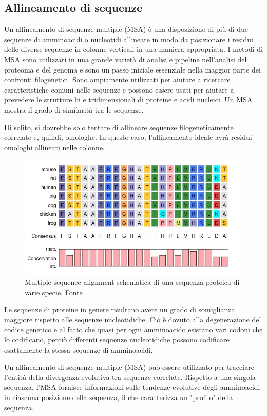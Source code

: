 \subsection{Allineamento di sequenze} \label{sec:MSA}
{
	Un allineamento di sequenze multiple (MSA) è una disposizione di più di due sequenze di amminoacidi o nucleotidi allineate in modo da posizionare i residui delle diverse sequenze in colonne verticali in una maniera appropriata. I metodi di MSA sono utilizzati in una grande varietà di analisi e pipeline nell'analisi del proteoma e del genoma e sono un passo iniziale essenziale nella maggior parte dei confronti filogenetici. Sono ampiamente utilizzati per aiutare a ricercare caratteristiche comuni nelle sequenze e possono essere usati per aiutare a prevedere le strutture bi e tridimensionali di proteine e acidi nucleici. Un MSA mostra il grado di similarità tra le sequenze.
	
	\par Di solito, si dovrebbe solo tentare di allineare sequenze filogeneticamente correlate e, quindi, omologhe. In questo caso, l'allineamento ideale avrà residui omologhi allineati nelle colonne.
	
	\begin{figure}[!htb]
		\centering
		\includegraphics[scale=0.5]{images/msa.jpeg}
		\caption{Multiple sequence alignment schematica di una sequenza proteica di varie specie. Fonte\cite{msaBioNinja}}
		\label{fig:msa}
	\end{figure}
	
	\par Le sequenze di proteine in genere risultano avere un grado di somiglianza maggiore rispetto alle sequenze nucleotidiche. Ciò è dovuto alla degenerazione del codice genetico e al fatto che quasi per ogni amminoacido esistano vari codoni che lo codificano, perciò differenti sequenze nucleotidiche possono codificare esattamente la stessa sequenze di amminoacidi.
	
	\par Un allineamento di sequenze multiple (MSA) può essere utilizzato per tracciare l'entità della divergenza evolutiva tra sequenze correlate. Rispetto a una singola sequenza, l'MSA fornisce informazioni sulle tendenze evolutive degli amminoacidi in ciascuna posizione della sequenza, il che caratterizza un "profilo" della sequenza.
	
}


